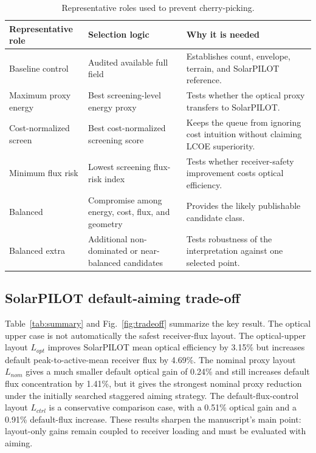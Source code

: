 \documentclass[final,3p,times]{elsarticle}
\begin{document}
\begin{table}[t]
\centering
\caption{Representative roles used to prevent cherry-picking.}
\label{tab:representative-roles}
\small
\begin{tabular}{p{}p{}p{}}
\toprule
Representative role & Selection logic & Why it is needed \\
\midrule
Baseline control & Audited available full field & Establishes count, envelope, terrain, and SolarPILOT reference. \\
Maximum proxy energy & Best screening-level energy proxy & Tests whether the optical proxy transfers to SolarPILOT. \\
Cost-normalized screen & Best cost-normalized screening score & Keeps the queue from ignoring cost intuition without claiming LCOE superiority. \\
Minimum flux risk & Lowest screening flux-risk index & Tests whether receiver-safety improvement costs optical efficiency. \\
Balanced & Compromise among energy, cost, flux, and geometry & Provides the likely publishable candidate class. \\
Balanced extra & Additional non-dominated or near-balanced candidates & Tests robustness of the interpretation against one selected point. \\
\bottomrule
\end{tabular}
\end{table}

\subsection{SolarPILOT default-aiming trade-off}
Table~\ref{tab:summary} and Fig.~\ref{fig:tradeoff} summarize the key result. The optical upper case is not automatically the safest receiver-flux layout. The optical-upper layout $L_{opt}$ improves SolarPILOT mean optical efficiency by 3.15\% but increases default peak-to-active-mean receiver flux by 4.69\%. The nominal proxy layout $L_{nom}$ gives a much smaller default optical gain of 0.24\% and still increases default flux concentration by 1.41\%, but it gives the strongest nominal proxy reduction under the initially searched staggered aiming strategy. The default-flux-control layout $L_{ctrl}$ is a conservative comparison case, with a 0.51\% optical gain and a 0.91\% default-flux increase. These results sharpen the manuscript's main point: layout-only gains remain coupled to receiver loading and must be evaluated with aiming.
\end{document}
